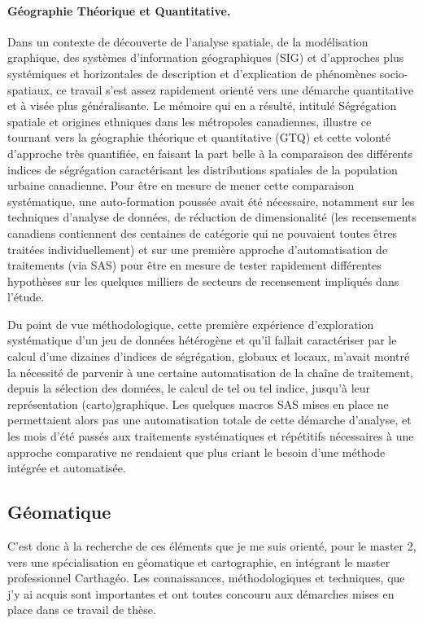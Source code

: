 \paragraph{Géographie Théorique et Quantitative.}
Dans un contexte de découverte de l'analyse spatiale, de la modélisation graphique, des systèmes d'information géographiques (SIG) et d'approches plus systémiques et horizontales de description et d'explication de phénomènes socio-spatiaux, ce travail s'est assez rapidement orienté vers une démarche quantitative et à visée plus généralisante.
Le mémoire qui en a résulté, intitulé \og Ségrégation spatiale et origines ethniques dans les métropoles canadiennes\fg{}, illustre ce tournant vers la géographie théorique et quantitative (GTQ) et cette volonté d'approche très quantifiée, en faisant la part belle à la comparaison des différents indices de ségrégation caractérisant les distributions spatiales de la population urbaine canadienne.
Pour être en mesure de mener cette comparaison systématique, une auto-formation poussée avait été nécessaire, notamment sur les techniques d'analyse de données, de réduction de dimensionalité (les recensements canadiens contiennent des centaines de catégorie qui ne pouvaient toutes êtres traitées individuellement) et sur une première approche d'automatisation de traitements (via SAS) pour être en mesure de tester rapidement différentes hypothèses sur les quelques milliers de \og secteurs de recensement\fg{} impliqués dans l'étude.

Du point de vue méthodologique, cette première expérience d'exploration systématique d'un jeu de données hétérogène et qu'il fallait caractériser par le calcul d'une dizaines d'indices de ségrégation, globaux et locaux, m'avait montré la nécessité de parvenir à une certaine automatisation de la chaîne de traitement, depuis la sélection des données, le calcul de tel ou tel indice, jusqu'à leur représentation (carto)graphique.
Les quelques macros SAS mises en place ne permettaient alors pas une automatisation totale de cette démarche d'analyse, et les mois d'été passés aux traitements systématiques et répétitifs nécessaires à une approche comparative ne rendaient que plus criant le besoin d'une méthode intégrée et automatisée.

\subsection{Géomatique}

C'est donc à la recherche de ces éléments que je me suis orienté, pour le master 2, vers une spécialisation en géomatique et cartographie, en intégrant le master professionnel Carthagéo.
Les connaissances, méthodologiques et techniques, que j'y ai acquis sont importantes et ont toutes concouru aux démarches mises en place dans ce travail de thèse.

